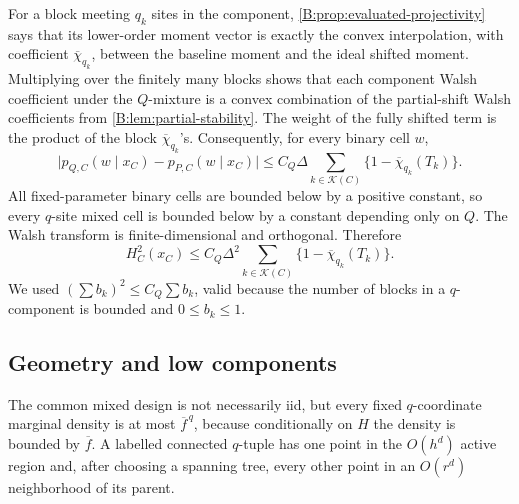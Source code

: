 \documentclass[11pt]{article}
\newcommand{\abs}[1]{\lvert #1\rvert}
\begin{document}
For a block meeting \(q_k\) sites in the component,
\cref{B:prop:evaluated-projectivity} says that its lower-order moment vector
is exactly the convex interpolation, with coefficient
\(\overline\chi_{q_k}\), between the baseline moment and the ideal shifted
moment.  Multiplying over the finitely many blocks shows that each component
Walsh coefficient under the \(Q\)-mixture is a convex combination of the
partial-shift Walsh coefficients from \cref{B:lem:partial-stability}.  The
weight of the fully shifted term is the product of the block
\(\overline\chi_{q_k}\)'s.  Consequently, for every binary cell \(w\),
\begin{equation}
 \abs{p_{Q,C}(w\mid x_C)-p_{P,C}(w\mid x_C)}
 \le C_Q\Delta
 \sum_{k\in\mathcal K(C)}
 \{1-\overline\chi_{q_k}(T_k)\}.
 \label{B:eq:component-cell-difference}
\end{equation}
All fixed-parameter binary cells are bounded below by a positive constant,
so every \(q\)-site mixed cell is bounded below by a constant depending only
on \(Q\).  The Walsh transform is finite-dimensional and orthogonal.
Therefore
\begin{equation}
 H_C^2(x_C)
 \le C_Q\Delta^2
 \sum_{k\in\mathcal K(C)}
 \{1-\overline\chi_{q_k}(T_k)\}.
 \label{B:eq:component-hellinger-local}
\end{equation}
We used \((\sum b_k)^2\le C_Q\sum b_k\), valid because the number of blocks
in a \(q\)-component is bounded and \(0\le b_k\le1\).

\subsection{Geometry and low components}

The common mixed design is not necessarily iid, but every fixed
\(q\)-coordinate marginal density is at most \(\overline f^{\,q}\), because
conditionally on \(H\) the density is bounded by \(\overline f\).  A
labelled connected \(q\)-tuple has one point in the \(O(h^d)\) active region
and, after choosing a spanning tree, every other point in an \(O(r^d)\)
neighborhood of its parent.
\end{document}
